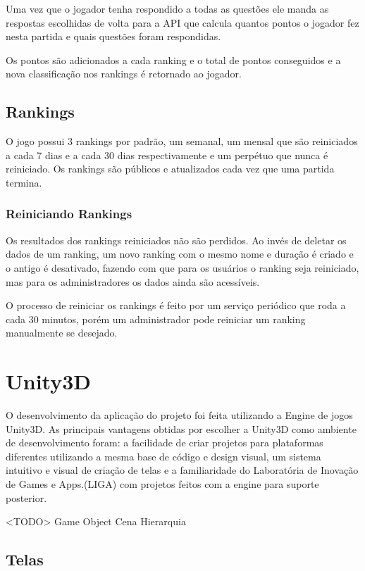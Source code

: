 Uma vez que o jogador tenha respondido a todas as questões ele manda as respostas escolhidas de volta para a API que calcula quantos pontos o jogador fez nesta partida e quais questões foram respondidas.

Os pontos são adicionados a cada ranking e o total de pontos conseguidos e a nova classificação nos rankings é retornado ao jogador.

\subsection{Rankings}
\label{subsec:rankings}

O jogo possui 3 rankings por padrão, um semanal, um mensal que são reiniciados a cada 7 dias e a cada 30 dias respectivamente e um perpétuo que nunca é reiniciado.
Os rankings são públicos e atualizados cada vez que uma partida termina.

\subsubsection{Reiniciando Rankings}
\label{subsubsec:reiniciando}

Os resultados dos rankings reiniciados não são perdidos. Ao invés de deletar os dados de um ranking, um novo ranking com o mesmo nome e duração é criado e o antigo é desativado, fazendo com que para os usuários o ranking seja reiniciado, mas para os administradores os dados ainda são acessíveis.

O processo de reiniciar os rankings é feito por um serviço periódico que roda a cada 30 minutos, porém um administrador pode reiniciar um ranking manualmente se desejado.

\section{Unity3D}
\label{sec:unity3d}

O desenvolvimento da aplicação do projeto foi feita utilizando a Engine de jogos Unity3D. As principais vantagens obtidas por escolher a Unity3D como ambiente de desenvolvimento foram: a facilidade de criar projetos
para plataformas diferentes utilizando a mesma base de código e design visual, um sistema intuitivo e visual de criação de telas e a familiaridade do Laboratória de Inovação de Games e Apps.(LIGA) com projetos feitos com a engine para suporte posterior.

<TODO>
Game Object
Cena
Hierarquia

\subsection{Telas}
\label{subsec:telas}

